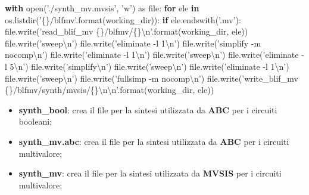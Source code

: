 \documentclass[italian,]{book}
\newenvironment{Shaded}{\begin{snugshade}}{\end{snugshade}}
\newcommand{\BuiltInTok}[1]{#1}
\newcommand{\CharTok}[1]{\textcolor[rgb]{0.31,0.60,0.02}{#1}}
\newcommand{\ControlFlowTok}[1]{\textcolor[rgb]{0.13,0.29,0.53}{\textbf{#1}}}
\newcommand{\ImportTok}[1]{#1}
\newcommand{\KeywordTok}[1]{\textcolor[rgb]{0.13,0.29,0.53}{\textbf{#1}}}
\newcommand{\NormalTok}[1]{#1}
\newcommand{\SpecialCharTok}[1]{\textcolor[rgb]{0.00,0.00,0.00}{#1}}
\newcommand{\StringTok}[1]{\textcolor[rgb]{0.31,0.60,0.02}{#1}}
\providecommand{\tightlist}{%
  \setlength{\itemsep}{0pt}\setlength{\parskip}{0pt}}
\begin{document}
\begin{Shaded}
\begin{Highlighting}[]
  \ControlFlowTok{with} \BuiltInTok{open}\NormalTok{(}\StringTok{'./synth_mv.mvsis'}\NormalTok{, }\StringTok{'w'}\NormalTok{) }\ImportTok{as} \BuiltInTok{file}\NormalTok{:}
    \ControlFlowTok{for}\NormalTok{ ele }\KeywordTok{in}\NormalTok{ os.listdir(}\StringTok{'}\SpecialCharTok{\{\}}\StringTok{/blfmv'}\NormalTok{.}\BuiltInTok{format}\NormalTok{(working_dir)):}
      \ControlFlowTok{if}\NormalTok{ ele.endswith(}\StringTok{'.mv'}\NormalTok{):}
        \BuiltInTok{file}\NormalTok{.write(}\StringTok{'read_blif_mv }\SpecialCharTok{\{\}}\StringTok{/blfmv/}\SpecialCharTok{\{\}}\CharTok{\textbackslash{}n}\StringTok{'}\NormalTok{.}\BuiltInTok{format}\NormalTok{(working_dir, ele))}
        \BuiltInTok{file}\NormalTok{.write(}\StringTok{'sweep}\CharTok{\textbackslash{}n}\StringTok{'}\NormalTok{)}
        \BuiltInTok{file}\NormalTok{.write(}\StringTok{'eliminate -l 1}\CharTok{\textbackslash{}n}\StringTok{'}\NormalTok{)}
        \BuiltInTok{file}\NormalTok{.write(}\StringTok{'simplify -m nocomp}\CharTok{\textbackslash{}n}\StringTok{'}\NormalTok{)}
        \BuiltInTok{file}\NormalTok{.write(}\StringTok{'eliminate -l 1}\CharTok{\textbackslash{}n}\StringTok{'}\NormalTok{)}
        \BuiltInTok{file}\NormalTok{.write(}\StringTok{'sweep}\CharTok{\textbackslash{}n}\StringTok{'}\NormalTok{)}
        \BuiltInTok{file}\NormalTok{.write(}\StringTok{'eliminate -l 5}\CharTok{\textbackslash{}n}\StringTok{'}\NormalTok{)}
        \BuiltInTok{file}\NormalTok{.write(}\StringTok{'simplify}\CharTok{\textbackslash{}n}\StringTok{'}\NormalTok{)}
        \BuiltInTok{file}\NormalTok{.write(}\StringTok{'sweep}\CharTok{\textbackslash{}n}\StringTok{'}\NormalTok{)}
        \BuiltInTok{file}\NormalTok{.write(}\StringTok{'eliminate -l 1}\CharTok{\textbackslash{}n}\StringTok{'}\NormalTok{)}
        \BuiltInTok{file}\NormalTok{.write(}\StringTok{'sweep}\CharTok{\textbackslash{}n}\StringTok{'}\NormalTok{)}
        \BuiltInTok{file}\NormalTok{.write(}\StringTok{'fullsimp -m nocomp}\CharTok{\textbackslash{}n}\StringTok{'}\NormalTok{)}
        \BuiltInTok{file}\NormalTok{.write(}\StringTok{'write_blif_mv }\SpecialCharTok{\{\}}\StringTok{/blfmv/synth/mvsis/}\SpecialCharTok{\{\}}\CharTok{\textbackslash{}n\textbackslash{}n}\StringTok{'}\NormalTok{.}\BuiltInTok{format}\NormalTok{(working_dir, ele))}
\end{Highlighting}
\end{Shaded}

\begin{itemize}
\tightlist
\item
  \textbf{synth\_bool}: crea il file per la sintesi utilizzata da \textbf{ABC} per i circuiti booleani;
\item
  \textbf{synth\_mv.abc}: crea il file per la sintesi utilizzata da \textbf{ABC} per i circuiti multivalore;
\item
  \textbf{synth\_mv}: crea il file per la sintesi utilizzata da \textbf{MVSIS} per i circuiti multivalore;
\end{itemize}
\end{document}
